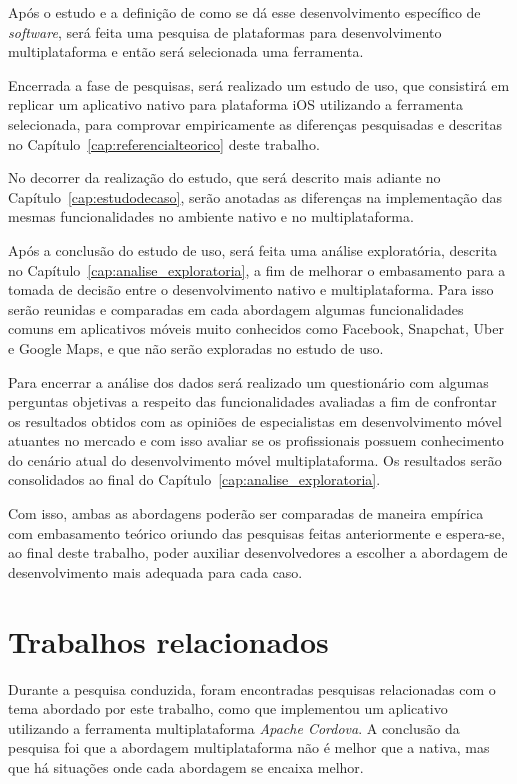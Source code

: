 Após o estudo e a definição de como se dá esse desenvolvimento específico de \textit{software},
será feita uma pesquisa de plataformas para desenvolvimento multiplataforma e então será selecionada uma ferramenta. 

Encerrada a fase de pesquisas, será realizado um estudo de uso, que consistirá em replicar um aplicativo nativo para plataforma iOS utilizando a ferramenta selecionada, 
para comprovar empiricamente as diferenças pesquisadas e descritas no Capítulo~\ref{cap:referencialteorico} deste trabalho.

No decorrer da realização do estudo, que será descrito mais adiante no Capítulo~\ref{cap:estudodecaso}, serão anotadas as diferenças na implementação das mesmas funcionalidades no ambiente nativo e no 
multiplataforma.

Após a conclusão do estudo de uso, será feita uma análise exploratória, descrita no Capítulo~\ref{cap:analise_exploratoria}, 
a fim de melhorar o embasamento para a tomada de decisão entre o desenvolvimento 
nativo e multiplataforma. Para isso serão reunidas e comparadas em cada abordagem algumas funcionalidades comuns em aplicativos 
móveis muito conhecidos como Facebook, Snapchat, Uber e Google Maps, e que não serão exploradas no estudo de uso. 

Para encerrar a análise dos dados será realizado um questionário com algumas perguntas objetivas a respeito das funcionalidades avaliadas a fim de confrontar os resultados obtidos com as opiniões de especialistas em 
desenvolvimento móvel atuantes no mercado e com isso avaliar se os profissionais possuem conhecimento do cenário atual do desenvolvimento móvel multiplataforma. Os resultados serão consolidados ao final do 
Capítulo~\ref{cap:analise_exploratoria}.

Com isso, ambas as abordagens poderão ser comparadas de maneira empírica com embasamento teórico oriundo das pesquisas feitas anteriormente e espera-se, ao final deste trabalho, poder auxiliar desenvolvedores a escolher 
a abordagem de desenvolvimento mais adequada para cada caso.  

\section{Trabalhos relacionados} \label{sec:trabalhosrelacionados}

Durante a pesquisa conduzida, foram encontradas pesquisas relacionadas com o tema abordado por este trabalho, como 
que implementou um aplicativo utilizando a ferramenta multiplataforma \textit{Apache Cordova}. A conclusão da pesquisa foi 
que a abordagem multiplataforma não é melhor que a nativa, mas que há situações onde cada abordagem se encaixa melhor.


